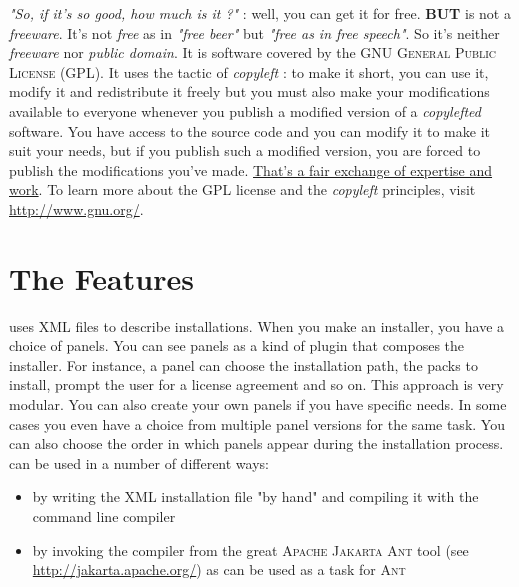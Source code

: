 \textit{"So, if it's so good, how much is it ?"} : well, you can get it
for free. \textbf{BUT} \IzPack is not a \textit{freeware}. It's not
\textit{free} as in \textit{"free beer"} but \textit{"free as in free
speech"}. So it's neither \textit{freeware} nor \textit{public domain}.
It is software covered by the \textsc{GNU General Public License} (GPL).
It uses the tactic of \textit{copyleft} : to make it short, you can use
it, modify it and redistribute it freely but you must also make your
modifications available to everyone whenever you publish a modified
version of a \textit{copylefted} software. You have access to the
\IzPack source code and you can modify it to make it suit your needs,
but if you publish such a modified version, you are forced to publish
the modifications you've made. \underline{That's a fair exchange of
expertise and  work}. To learn more about the GPL license and the
\textit{copyleft} principles, visit \mbox{\url{http://www.gnu.org/}}.\\

\section*{The Features}

\IzPack uses XML files to describe installations. When you make an
installer, you have a choice of panels. You can see panels as a kind of
plugin that composes the installer. For instance, a panel can choose the
installation path, the packs to install, prompt the user for a license
agreement and so on. This approach is very modular. You can also create
your own panels if you have specific needs. In some cases you even have
a choice from multiple panel versions for the same task. You can also
choose the order in which panels appear during the installation process.
\IzPack can be used in a number of different ways:
\begin{itemize}
  \item by writing the XML installation file "by hand" and compiling
  it with the command line compiler
  \item by invoking the compiler from the great \textsc{Apache Jakarta
  Ant} tool (see \url{http://jakarta.apache.org/}) as \IzPack can be
  used as a task for \textsc{Ant}
\end{itemize}\

